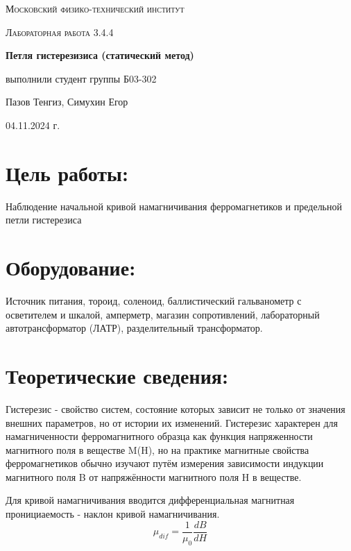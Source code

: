 \documentclass[a4paper, 12pt]{article}
\begin{document}
\begin{titlepage}
	\centering
	{\scshape\LARGE Московский физико-технический институт \par}
	\vspace{10cm}
	{\scshape\Large Лабораторная работа 3.4.4 \par}
	\vspace{1cm}
	{\huge\bfseries Петля гистерезизиса (статический метод) \par}
	\vspace{1cm}
	\vfill
\begin{flushright}
	{\large выполнили студент группы Б03-302}\par
	\vspace{0.3cm}
	{\LARGE Пазов Тенгиз, Симухин Егор}

\end{flushright}
	\vfill
	04.11.2024 г.
\end{titlepage}
\large\section{Цель работы:}
\hspace{0.6cm} Наблюдение начальной кривой намагничивания ферромагнетиков и предельной петли гистерезиса

\section{Оборудование:}
\hspace{0.6cm} Источник питания, тороид, соленоид, баллистический гальванометр с осветителем и шкалой, амперметр, магазин сопротивлений, лабораторный автотрансформатор (ЛАТР), разделительный
трансформатор.

\section{Теоретические сведения:}
\hspace{0.6cm} Гистерезис - свойство систем, состояние которых зависит не только от значения внешних параметров, но от истории их изменений.
Гистерезис характерен для намагниченности ферромагнитного образца как функция напряженности магнитного поля в веществе M(H), но на практике магнитные свойства ферромагнетиков обычно изучают
путём измерения зависимости индукции магнитного поля B от напряжённости магнитного поля H в веществе.

Для кривой намагничивания вводится дифференциальная магнитная пронициаемость - наклон кривой намагничивания.
\begin{equation}
    \mu_{dif} = \frac{1}{\mu_0} \frac{dB}{dH}
\end{equation}
\end{document}
